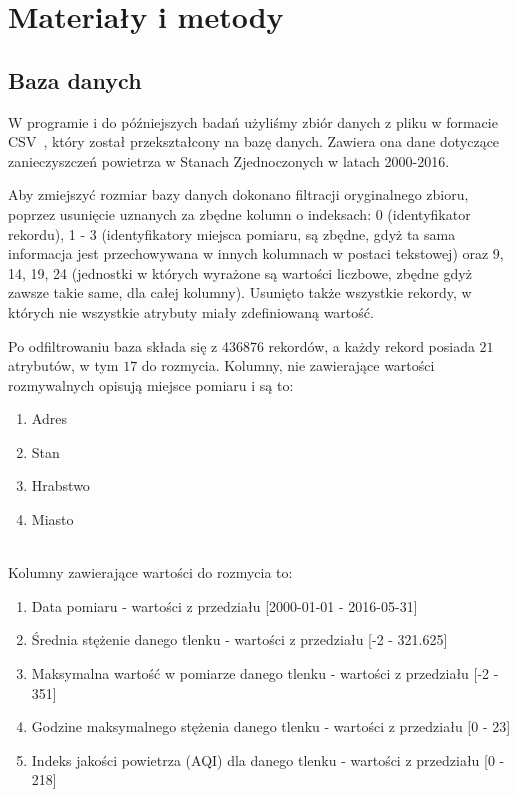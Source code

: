 \documentclass{classrep}
\begin{document}
    \section{Materiały i metody} {

        \subsection{Baza danych} {
            W programie i do późniejszych badań użyliśmy zbiór danych z pliku w formacie
            CSV~\cite{baza}, który został przekształcony na bazę danych. Zawiera ona dane
            dotyczące zanieczyszczeń powietrza w Stanach Zjednoczonych w latach 2000-2016.

            Aby zmiejszyć rozmiar bazy danych dokonano filtracji oryginalnego zbioru, poprzez
            usunięcie uznanych za zbędne kolumn o indeksach: 0 (identyfikator rekordu),
            1 - 3 (identyfikatory miejsca pomiaru, są zbędne, gdyż ta sama informacja jest
            przechowywana w innych kolumnach w postaci tekstowej) oraz 9, 14, 19, 24 (jednostki
            w których wyrażone są wartości liczbowe, zbędne gdyż zawsze takie same, dla całej
            kolumny). Usunięto także wszystkie rekordy, w których nie wszystkie atrybuty miały
            zdefiniowaną wartość.

            Po odfiltrowaniu baza składa się z 436876 rekordów, a każdy rekord posiada $21$
            atrybutów, w tym $17$ do rozmycia. Kolumny, nie zawierające wartości rozmywalnych
            opisują miejsce pomiaru i są to:
            \begin{enumerate}
                \item Adres
                \item Stan
                \item Hrabstwo
                \item Miasto
            \end{enumerate}

            \ \\
            Kolumny zawierające wartości do rozmycia to:
            \begin{enumerate}
                \item Data pomiaru - wartości z przedziału [2000-01-01 - 2016-05-31]
                \item Średnia stężenie danego tlenku - wartości z przedziału [-2 - 321.625]
                \item Maksymalna wartość w pomiarze danego tlenku - wartości z przedziału [-2 - 351]
                \item Godzine maksymalnego stężenia danego tlenku - wartości z przedziału [0 - 23]
                \item Indeks jakości powietrza (AQI) dla danego tlenku - wartości z przedziału [0 - 218]
            \end{enumerate}

}}
\end{document}
